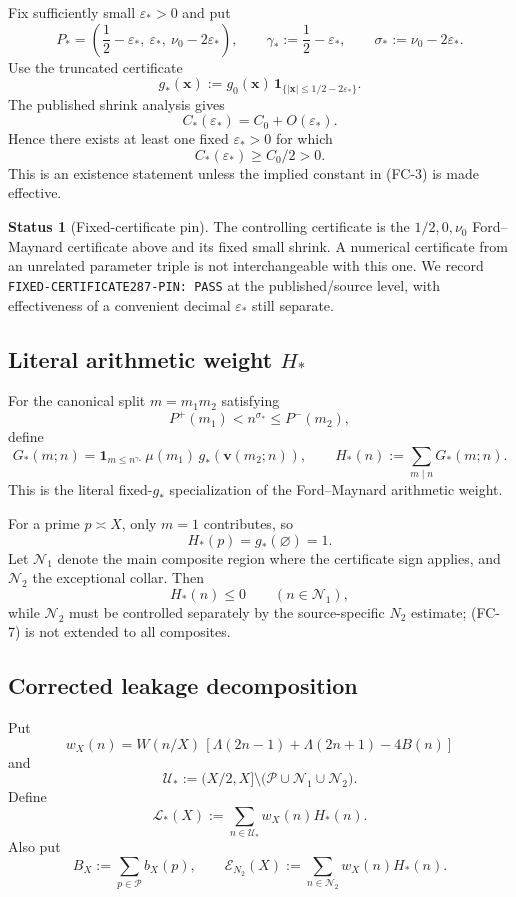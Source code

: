 \documentclass[11pt]{article}
\theoremstyle{definition}
\newtheorem{status}[theorem]{Status}
\theoremstyle{remark}
\newcommand{\1}{\mathbf 1}
\begin{document}
Fix sufficiently small $\varepsilon_*>0$ and put
\[
 P_*=
 \left(\frac12-\varepsilon_*,\ \varepsilon_*,\ \nu_0-2\varepsilon_*\right),
 \qquad
 \gamma_*:=\frac12-\varepsilon_*,
 \qquad
 \sigma_*:=\nu_0-2\varepsilon_*.
\]
Use the truncated certificate
\[
 g_*(\mathbf x)
 :=
 g_0(\mathbf x)\,
 \mathbf 1_{\{|\mathbf x|\le1/2-2\varepsilon_*\}}.
 \tag{FC-2}
\]
The published shrink analysis gives
\[
 C_*(\varepsilon_*)=C_0+O(\varepsilon_*).
 \tag{FC-3}
\]
Hence there exists at least one fixed $\varepsilon_*>0$ for which
\[
 \boxed{C_*(\varepsilon_*)\ge C_0/2>0.}
 \tag{FC-4}
\]
This is an existence statement unless the implied constant in (FC-3) is made effective.

\begin{status}[Fixed-certificate pin]
The controlling certificate is the $1/2,0,\nu_0$ Ford--Maynard certificate above and its fixed small shrink.
A numerical certificate from an unrelated parameter triple is not interchangeable with this one.
We record \texttt{FIXED-CERTIFICATE287-PIN: PASS} at the published/source level, with effectiveness of a
convenient decimal $\varepsilon_*$ still separate.
\end{status}

\subsection{Literal arithmetic weight $H_*$}

For the canonical split $m=m_1m_2$ satisfying
\[
 P^+(m_1)<n^{\sigma_*}\le P^-(m_2),
\]
define
\[
 G_*(m;n)
 =
 \mathbf 1_{m\le n^{\gamma_*}}\,
 \mu(m_1)\,
 g_*\!\left(\mathbf v(m_2;n)\right),
\qquad
 \boxed{H_*(n):=\sum_{m\mid n}G_*(m;n).}
 \tag{FC-5}
\]
This is the literal fixed-$g_*$ specialization of the Ford--Maynard arithmetic weight.

For a prime $p\asymp X$, only $m=1$ contributes, so
\[
 \boxed{H_*(p)=g_*(\varnothing)=1.}
 \tag{FC-6}
\]
Let $\mathcal N_1$ denote the main composite region where the certificate sign applies, and
$\mathcal N_2$ the exceptional collar.  Then
\[
 H_*(n)\le0\qquad(n\in\mathcal N_1),
 \tag{FC-7}
\]
while $\mathcal N_2$ must be controlled separately by the source-specific $N_2$ estimate; (FC-7) is not
extended to all composites.

\subsection{Corrected leakage decomposition}

Put
\[
 w_X(n)=W(n/X)\,[\Lambda(2n-1)+\Lambda(2n+1)-4B(n)]
\]
and
\[
 \mathcal U_*:=(X/2,X]\setminus
 \bigl(\mathcal P\cup\mathcal N_1\cup\mathcal N_2\bigr).
\]
Define
\[
 \boxed{\mathcal L_*(X):=\sum_{n\in\mathcal U_*}w_X(n)H_*(n).}
 \tag{FC-8}
\]
Also put
\[
 B_X:=\sum_{p\in\mathcal P}b_X(p),\qquad
 \mathcal E_{N_2}(X):=
 \sum_{n\in\mathcal N_2}w_X(n)H_*(n).
\]
\end{document}
